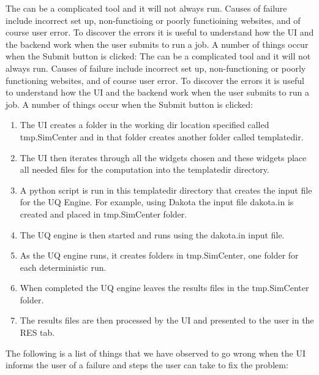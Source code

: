 The \texttt{\getsoftwarename{}} can be a complicated tool and it will not always run. Causes of failure include incorrect set up, non-functioing or poorly functioining websites, and of course user error. To discover the errors it is useful to understand how the UI and the backend work when the user submits to run a job. A number of things occur when the Submit button is clicked: 
The \texttt{\getsoftwarename{}} can be a complicated tool and it will not always run. Causes of failure include incorrect set up, non-functioning or poorly functioning websites, and of course user error. To discover the errors it is useful to understand how the UI and the backend work when the user submits to run a job. A number of things occur when the Submit button is clicked: 

\begin{enumerate}
\item The UI creates a folder in the working dir location specified called tmp.SimCenter and in that folder creates another folder called templatedir.
\item The UI then iterates through all the widgets chosen and these widgets place all needed files for the computation into the templatedir directory.
\item A python script is run in this templatedir directory that creates the input file for the UQ Engine. For example, using Dakota the input file dakota.in is created and placed in tmp.SimCenter folder.
\item The UQ engine is then started and runs using the dakota.in input file.
\item As the UQ engine runs, it creates folders in tmp.SimCenter, one folder for each deterministic run.
\item When completed the UQ engine leaves the results files in the tmp.SimCenter folder.
\item The results files are then processed by the UI and presented to the user in the RES tab.
\end{enumerate}

The following is a list of things that we have observed to go wrong when the UI informs the user of a failure and steps the user can take to fix the problem:  

